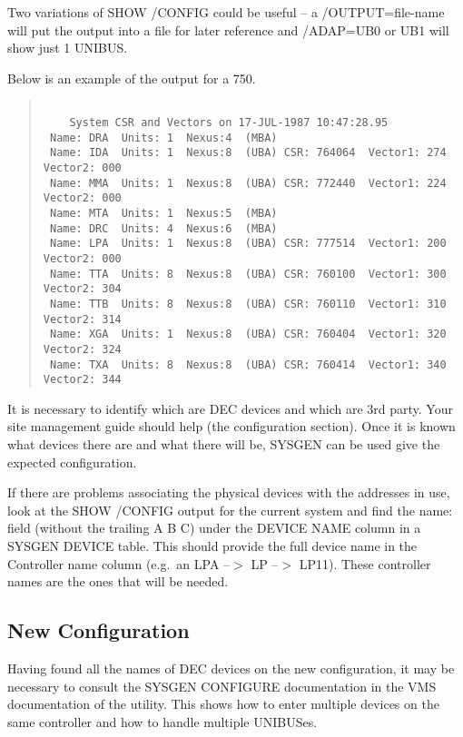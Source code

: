 Two variations of SHOW /CONFIG could be useful -- a /OUTPUT=file-name
 will put the output into a file for later reference and /ADAP=UB0 or UB1
 will show just 1 UNIBUS.

Below is an example of the output for a 750.
\begin{quote}
\begin{verbatim}

	System CSR and Vectors on 17-JUL-1987 10:47:28.95
 Name: DRA  Units: 1  Nexus:4  (MBA) 
 Name: IDA  Units: 1  Nexus:8  (UBA) CSR: 764064  Vector1: 274  Vector2: 000
 Name: MMA  Units: 1  Nexus:8  (UBA) CSR: 772440  Vector1: 224  Vector2: 000
 Name: MTA  Units: 1  Nexus:5  (MBA) 
 Name: DRC  Units: 4  Nexus:6  (MBA) 
 Name: LPA  Units: 1  Nexus:8  (UBA) CSR: 777514  Vector1: 200  Vector2: 000
 Name: TTA  Units: 8  Nexus:8  (UBA) CSR: 760100  Vector1: 300  Vector2: 304
 Name: TTB  Units: 8  Nexus:8  (UBA) CSR: 760110  Vector1: 310  Vector2: 314
 Name: XGA  Units: 1  Nexus:8  (UBA) CSR: 760404  Vector1: 320  Vector2: 324
 Name: TXA  Units: 8  Nexus:8  (UBA) CSR: 760414  Vector1: 340  Vector2: 344

\end{verbatim}
\end{quote}

It is necessary to identify which are DEC devices and which are 3rd party.
Your  site management guide should help (the configuration section).
Once it is known what devices there are and what there will be, SYSGEN can 
be used give the expected configuration.


If there are problems associating the physical devices with the addresses
in use, look at the SHOW /CONFIG output for the current
 system and find the name: field (without the trailing A B C) under the
 DEVICE NAME column in a SYSGEN DEVICE table.
 This should provide the full  device name in the Controller name column 
 (e.g.\ an LPA --$>$ LP --$>$ LP11).
These controller names are the ones that will be needed.

\subsection{New Configuration}

Having found all the names of DEC devices on the new configuration, it may be 
necessary to consult the SYSGEN  CONFIGURE documentation in the VMS
documentation of the utility.
This shows how to enter multiple devices on the same controller and
how to handle multiple UNIBUSes.

